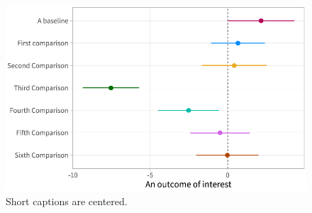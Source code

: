 \documentclass[
  a4paper,
  twoside]{article}
\begin{document}
\begin{figure}[H]

{\centering \includegraphics[width=\linewidth,]{chrisdoc_example_files/figure-latex/anotherplot-1} 

}

\caption{Short captions are centered.}\label{fig:anotherplot}
\end{figure}
\end{document}
